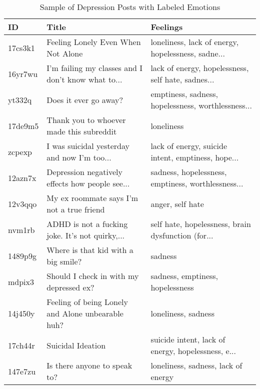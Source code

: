 \begin{table}
\centering
\caption{Sample of Depression Posts with Labeled Emotions}
\label{tab:depression_data}
\begin{tabular}{lll}
\toprule
     ID &                                              Title &                                           Feelings \\
\midrule
17cs3k1 &                 Feeling Lonely Even When Not Alone & loneliness, lack of energy, hopelessness, sadne... \\
16yr7wu & I'm failing my classes and I don't know what to... & lack of energy, hopelessness, self hate, sadnes... \\
 yt332q &                              Does it ever go away? & emptiness, sadness, hopelessness, worthlessness... \\
17de9m5 &           Thank you to whoever made this subreddit &                                         loneliness \\
 zcpexp &        I was suicidal yesterday and now I'm too... & lack of energy, suicide intent, emptiness, hope... \\
12azn7x &    Depression negatively effects how people see... & sadness, hopelessness, emptiness, worthlessness... \\
12v3qqo &          My ex roommate says I’m not a true friend &                                   anger, self hate \\
 nvm1rb &    ADHD is not a fucking joke. It's not quirky,... & self hate, hopelessness, brain dysfunction (for... \\
1489p9g &                Where is that kid with a big smile? &                                            sadness \\
 mdpix3 &            Should I check in with my depressed ex? &                   sadness, emptiness, hopelessness \\
14j450y &  Feeling of being Lonely and Alone unbearable huh? &                                loneliness, sadness \\
17ch44r &                                  Suicidal Ideation & suicide intent, lack of energy, hopelessness, e... \\
147e7zu &                       Is there anyone to speak to? &                loneliness, sadness, lack of energy \\
\bottomrule
\end{tabular}
\end{table}
